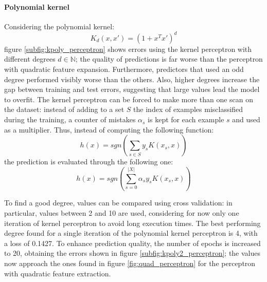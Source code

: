 \documentclass{article}
\begin{document}
\paragraph{Polynomial kernel}
Considering the polynomial kernel:
\begin{equation}
	K_d(x,x') = (1 + x^T x')^d
\end{equation}
figure \ref{subfig:kpoly_perceptron} shows errors using the kernel perceptron with different degrees $d\in \mathbb{N}$; the quality of predictions is far worse than the perceptron with quadratic feature expansion. Furthermore, predictors that used an odd degree performed visibly worse than the others. Also, higher degrees increase the gap between training and test errors, suggesting that large values lead the model to overfit. The kernel perceptron can be forced to make more than one scan on the dataset: instead of adding to a set $S$ the index of examples misclassified during the training, a counter of mistakes $\alpha_s$ is kept for each example $s$ and used as a multiplier. Thus, instead of computing the following function:
\begin{equation}
	h(x) = sgn\left(\sum_{s\in S} y_s K(x_s, x) \right)
\end{equation}
the prediction is evaluated through the following one:
\begin{equation}
	h(x) = sgn\left(\sum_{s=0}^{|X|} \alpha_s y_s K(x_s,x)\right)
\end{equation}

To find a good degree, values can be compared using cross validation: in particular, values between 2 and 10 are used, considering for now only one iteration of kernel perceptron to avoid long execution times. The best performing degree found for a single iteration of the polynomial kernel perceptron is 4, with a loss of 0.1427. To enhance prediction quality, the number of epochs is increased to 20, obtaining the errors shown in figure \ref{subfig:kpoly2_perceptron}; the values now approach the ones found in figure \ref{fig:quad_perceptron} for the perceptron with quadratic feature extraction.
\end{document}
